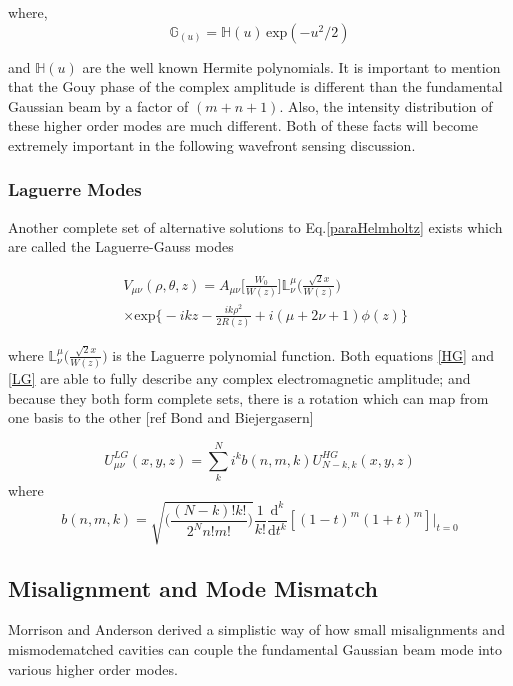 \documentclass[oneside]{book}
\begin{document}
		where,
		\begin{equation}
		\mathbb{G}_(u) = \mathbb{H}(u) \, \text{exp}(-u^2/2)
		\end{equation}
		
		and $ \mathbb{H}(u)$ are the well known Hermite polynomials.  It is important to mention that the Gouy phase of the complex amplitude is different than the fundamental Gaussian beam by a factor of $(m + n + 1)$. Also, the intensity distribution of these higher order modes are much different. Both of these facts will become extremely important in the following wavefront sensing discussion.
		
		\subsubsection{Laguerre Modes}
		Another complete set of alternative solutions to Eq.\ref{paraHelmholtz} exists which are called the Laguerre-Gauss modes
		
		\begin{equation}\label{LG}
		\begin{aligned}
		&V_{\mu\nu}(\rho,\theta,z) = A_{\mu\nu}\bigg[ \frac{W_0}{W(z)} \bigg] \mathbb{L}^{\mu}_{\nu} \Bigg( \frac{\sqrt{2}x}{W(z)}  \Bigg) \\
		&\times \text{exp} \bigg\{-ikz-\frac{ik\rho^2}{2R(z)} + i(\mu+2\nu+1)\phi(z) \bigg\}
		\end{aligned}
		\end{equation}
		
		where $\mathbb{L}^{\mu}_{\nu} \Bigg( \frac{\sqrt{2}x}{W(z)}  \Bigg)$ is the Laguerre polynomial function. Both equations \ref{HG} and \ref{LG} are able to fully describe any complex electromagnetic amplitude; and because they both form complete sets, there is a rotation which can map from one basis to the other [ref Bond and Biejergasern]
		
		\begin{equation}
		U^{LG}_{\mu \nu} (x,y,z) = \sum\limits_{k}^{N} i^k b(n,m,k) U^{HG}_{N-k,k} (x,y,z)
		\end{equation}
		where
		\begin{equation}
		b(n,m,k) = \sqrt{\bigg( \frac{(N-k)!k!}{2^N n!m!} \bigg)} \frac{1}{k!} \frac{\text{d}^k}{\text{d}t^k}[(1-t)^m (1+t)^m]\vert_{t=0}
		\end{equation}

		\subsection{Misalignment and Mode Mismatch}\label{Misalignment}
		Morrison and Anderson derived a simplistic way of how small misalignments and mismodematched cavities can couple the fundamental Gaussian beam mode into various higher order modes.
		
\end{document}
